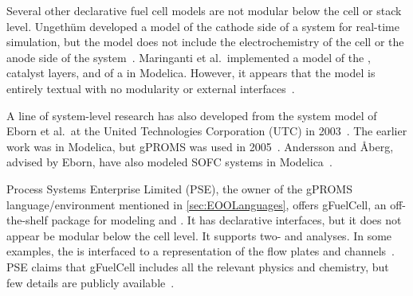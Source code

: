 Several other declarative fuel cell models are not modular below the cell or stack level.  Ungeth\"um developed a model of the cathode side of a  system for real-time simulation, but the model does not include the electrochemistry of the cell or the anode side of the system~\cite{Ungethum2005}.  Maringanti et al.\ implemented a model of the , catalyst layers, and  of a  in Modelica.  However, it appears that the model is entirely textual with no modularity or external interfaces~\cite{Maringanti2005}.

A line of system-level research has also developed from the  system model of Eborn et al.\ at the United Technologies Corporation (UTC) in 2003~\cite{Eborn2003}.  The earlier work was in Modelica, but gPROMS was used in 2005~\cite{Seshadri2005}.  Andersson and \r{A}berg, advised by Eborn, have also modeled SOFC systems in Modelica~\cite{Andersson2010, Andersson2011}.

Process Systems Enterprise Limited (PSE), the owner of the gPROMS language\slash{}environment mentioned in \autoref{sec:EOOLanguages}, offers gFuelCell, an off-the-shelf package for modeling  and .  It has declarative interfaces, but it does not appear be modular below the cell level.  It supports two- and  analyses.  In some examples, the  is interfaced to a  representation of the flow plates and channels~\cite{Matzopoulos2007}.  PSE claims that gFuelCell includes all the relevant physics and chemistry, but few details are publicly available~\cite{gFuelCell}.

